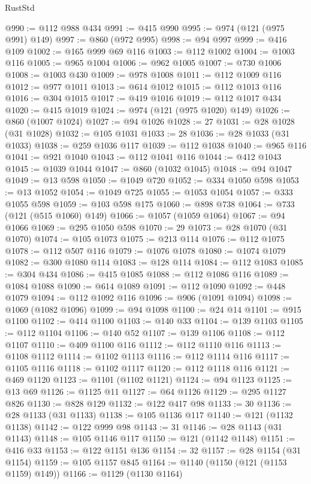 \begin{lexlean}{RustStd}
\begin{coremodule}
{\begin{coremodule}
{{{{{{{{{{{{{{{{{{{{{{{{{{{{{{{{{{{{{{{{{{{{@990 := @112 @988 @434
@991 := @415 @990
@995 := @974 (@121 (@975 @991) @149)
@997 := @860 (@972 @995)
@998 := @94 @997
@999 := @416 @109
@1002 := @165 @999 @69 @116
@1003 := @112 @1002
@1004 := @1003 @116
@1005 := @965 @1004
@1006 := @962 @1005
@1007 := @730 @1006
@1008 := @1003 @430
@1009 := @978 @1008
@1011 := @112 @1009 @116
@1012 := @977 @1011
@1013 := @614 @1012
@1015 := @112 @1013 @116
@1016 := @304 @1015
@1017 := @419 @1016
@1019 := @112 @1017 @434
@1020 := @415 @1019
@1024 := @974 (@121 (@975 @1020) @149)
@1026 := @860 (@1007 @1024)
@1027 := @94 @1026
@1028 := 27
@1031 := @28 @1028 (@31 @1028)
@1032 := @105 @1031
@1033 := 28
@1036 := @28 @1033 (@31 @1033)
@1038 := @259 @1036 @117
@1039 := @112 @1038
@1040 := @965 @116
@1041 := @921 @1040
@1043 := @112 @1041 @116
@1044 := @412 @1043
@1045 := @1039 @1044
@1047 := @860 (@1032 @1045)
@1048 := @94 @1047
@1049 := @13 @598
@1050 := @1049 @720
@1052 := @334 @1050 @598
@1053 := @13 @1052
@1054 := @1049 @725
@1055 := @1053 @1054
@1057 := @333 @1055 @598
@1059 := @103 @598 @175
@1060 := @898 @738
@1064 := @733 (@121 (@515 @1060) @149)
@1066 := @1057 (@1059 @1064)
@1067 := @94 @1066
@1069 := @295 @1050 @598
@1070 := 29
@1073 := @28 @1070 (@31 @1070)
@1074 := @105 @1073
@1075 := @213 @114
@1076 := @112 @1075
@1078 := @112 @507 @116
@1079 := @1076 @1078
@1080 := @1074 @1079
@1082 := @300 @1080 @114
@1083 := @128 @114
@1084 := @112 @1083
@1085 := @304 @434
@1086 := @415 @1085
@1088 := @112 @1086 @116
@1089 := @1084 @1088
@1090 := @614 @1089
@1091 := @112 @1090
@1092 := @448 @1079
@1094 := @112 @1092 @116
@1096 := @906 (@1091 @1094)
@1098 := @1069 (@1082 @1096)
@1099 := @94 @1098
@1100 := @24 @14
@1101 := @915 @1100
@1102 := @414 @1100
@1103 := @140 @33
@1104 := @139 @1103
@1105 := @112 @1104
@1106 := @140 @52
@1107 := @139 @1106
@1108 := @112 @1107
@1110 := @409 @1100 @116
@1112 := @112 @1110 @116
@1113 := @1108 @1112
@1114 := @1102 @1113
@1116 := @112 @1114 @116
@1117 := @1105 @1116
@1118 := @1102 @1117
@1120 := @112 @1118 @116
@1121 := @469 @1120
@1123 := @1101 (@1102 @1121)
@1124 := @94 @1123
@1125 := @13 @69
@1126 := @1125 @11
@1127 := @64 @1126
@1129 := @295 @1127 @826
@1130 := @828 @129
@1132 := @122 @417 @98
@1133 := 30
@1136 := @28 @1133 (@31 @1133)
@1138 := @105 @1136 @117
@1140 := @121 (@1132 @1138)
@1142 := @122 @999 @98
@1143 := 31
@1146 := @28 @1143 (@31 @1143)
@1148 := @105 @1146 @117
@1150 := @121 (@1142 @1148)
@1151 := @416 @33
@1153 := @122 @1151 @136
@1154 := 32
@1157 := @28 @1154 (@31 @1154)
@1159 := @105 @1157 @845
@1164 := @1140 (@1150 (@121 (@1153 @1159) @149))
@1166 := @1129 (@1130 @1164)
}}}}}}}}}}}}}}}}}}}}}}}}}}}}}}}}}}}}}}}}}}}}
\end{coremodule}}
\end{coremodule}
\end{lexlean}
